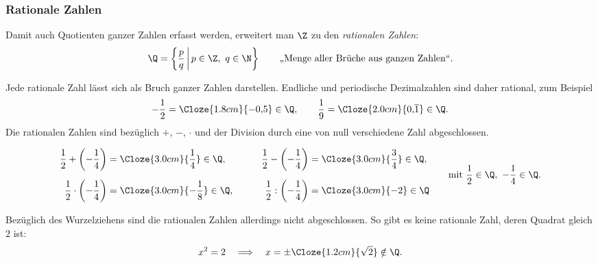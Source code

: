 \subsubsection{Rationale Zahlen}
\label{subsubsec:fundamentals_rational_numbers}

Damit auch Quotienten ganzer Zahlen erfasst werden, erweitert man $\Z$ zu den
\emph{rationalen Zahlen}:
\[
  \Q=\left\{\frac pq\,\middle|\,p\in\Z,\ q\in\N\right\}
  \qquad \text{„Menge aller Brüche aus ganzen Zahlen“}.
\]
\begin{center}
  \begingroup
    \def\NumberSetStage{3}
  \endgroup
\end{center}
Jede rationale Zahl lässt sich als Bruch ganzer Zahlen darstellen. Endliche
und periodische Dezimalzahlen sind daher rational, zum Beispiel
\[
  -\frac12=\Cloze{1.8cm}{-0{,}5}\in\Q,
  \qquad
  \frac19=\Cloze{2.0cm}{0{,}\overline{1}}\in\Q.
\]
Die rationalen Zahlen sind bezüglich $+$, $-$, $\cdot$ und der Division durch
eine von null verschiedene Zahl abgeschlossen.

\[
  \begin{aligned}
    \frac12+\left(-\frac14\right)
      &=\Cloze{3.0cm}{\frac14}\in\Q,
    &\qquad
    \frac12-\left(-\frac14\right)
      &=\Cloze{3.0cm}{\frac34}\in\Q,\\[0.5em]
    \frac12\cdot\left(-\frac14\right)
      &=\Cloze{3.0cm}{-\frac18}\in\Q,
    &\qquad
    \frac12:\left(-\frac14\right)
      &=\Cloze{3.0cm}{-2}\in\Q
  \end{aligned}
  \qquad
  \text{mit } \frac12\in\Q,\ -\frac14\in\Q.
\]

Bezüglich des Wurzelziehens sind die rationalen Zahlen allerdings nicht
abgeschlossen. So gibt es keine rationale Zahl, deren Quadrat gleich $2$ ist:
\[
  x^2=2
  \quad\Longrightarrow\quad
  x=\pm\Cloze{1.2cm}{\sqrt2}\notin\Q.
\]

